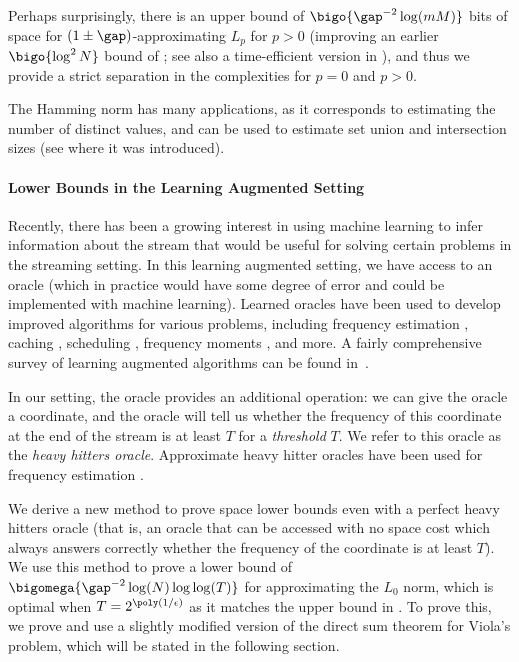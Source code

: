 Perhaps surprisingly, 
there is an upper bound of $\bigo{\gap^{-2}\log(mM)}$ bits of space for $(1\pm\gap)$-approximating
$L_p$ for $p>0$ \cite{knw10b}  (improving an earlier $\bigo{\log^2 N}$ bound of \cite{i06}; see also a time-efficient version in \cite{knpw11}), 
and thus we provide 
a strict separation in the complexities for $p = 0$ and $p > 0$. 

The Hamming norm has many applications, as it corresponds to estimating the number of distinct values, and can be used to estimate set union and intersection sizes (see \cite{CDIM03} where it was introduced).

\paragraph*{Lower Bounds in the Learning Augmented Setting}

Recently, there has been a growing interest in using machine learning to infer information about the stream that would be useful for solving certain problems in the streaming setting. In this learning augmented setting, we have access to an oracle (which in practice would have some degree of error and could be implemented with machine learning).  Learned oracles have been used to develop improved algorithms for various problems, including frequency estimation \cite{hsu2018learningbased}, caching \cite{lykouris2018competitive}, scheduling \cite{mitzenmacher_scheduling_2020}, frequency moments \cite{Jiang2020Learning-Augmented}, and more. A fairly comprehensive survey of learning augmented algorithms can be found %
in~\cite{DBLP:books/cu/20/MitzenmacherV20}.  %

In our setting, the oracle provides an additional operation: we can give the oracle a coordinate, and the oracle will tell us whether the frequency of this coordinate at the end of the stream is at least $T$ for a \emph{threshold} $T$. We refer to this oracle as the \emph{heavy hitters oracle}. Approximate heavy hitter oracles have been used for frequency estimation \cite{hsu2018learningbased}.

%
 We derive a new method %
%
%
to prove space lower bounds even with a perfect heavy hitters oracle {\color{black}(that is, an oracle that can be accessed with no space cost which always answers correctly whether the frequency of the coordinate is at least $T$)}. We use this method to prove a lower bound of $\bigomega{\gap^{-2}\log(N)\log\log(T)}$ for approximating the $L_0$ norm, which is optimal when $T = 2^{\poly(1/\epsilon)}$ as it matches the upper bound in \cite{Jiang2020Learning-Augmented}. {\color{black}To prove this, we prove and use a slightly modified version of the direct sum theorem for Viola's problem, which will be stated in the following section.}

